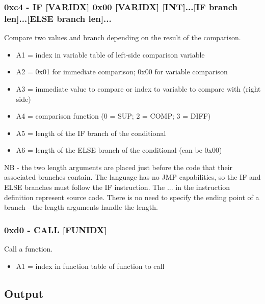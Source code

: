 \documentclass[12pt]{scrbook}
\begin{document}
\subsubsection{0xc4 - IF [VARIDX] 0x00 [VARIDX] [INT]...[IF branch len]...[ELSE branch len]...}
Compare two values and branch depending on the result of the comparison.
\begin{itemize}
\item A1 = index in variable table of left-side comparison variable
\item A2 = 0x01 for immediate comparison; 0x00 for variable comparison
\item A3 = immediate value to compare or index to variable to compare with (right side)
\item A4 = comparison function (0 = SUP; 2 = COMP; 3 = DIFF)
\item A5 = length of the IF branch of the conditional
\item A6 = length of the ELSE branch of the conditional (can be 0x00)
\end{itemize}
NB - the two length arguments are placed just before the code that their associated branches contain.
The language has no JMP capabilities, so the IF and ELSE branches must follow the IF instruction.
The ... in the instruction definition represent source code.  There is no need to specify the
ending point of a branch - the length arguments handle the length.

\subsubsection{0xd0 - CALL [FUNIDX]}
Call a function.
\begin{itemize}
\item A1 = index in function table of function to call
\end{itemize}

\subsection{Output}
\end{document}
